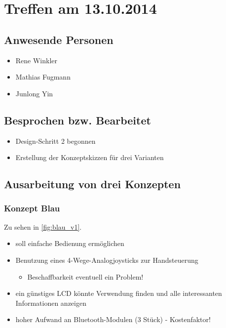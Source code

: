 \chapter{Treffen am 13.10.2014}
\section{Anwesende Personen}
\begin{itemize}
	\item Rene Winkler
	\item Mathias Fugmann
	\item Junlong Yin
\end{itemize}

\section{Besprochen bzw. Bearbeitet}
\begin{itemize}
	\item Design-Schritt 2 begonnen
	\item Erstellung der Konzeptskizzen für drei Varianten
\end{itemize}

\section{Ausarbeitung von drei Konzepten}
\subsection{Konzept Blau}
Zu sehen in \autoref{fig:blau_v1}.
\begin{itemize}
	\item soll einfache Bedienung ermöglichen
	\item Benutzung eines 4-Wege-Analogjoysticks zur Handsteuerung
	\begin{itemize}
		\item Beschaffbarkeit eventuell ein Problem!
	\end{itemize}
	\item ein günstiges LCD könnte Verwendung finden und alle interessanten 	Informationen anzeigen
	\item hoher Aufwand an Bluetooth-Modulen (3 Stück) - Kostenfaktor!
\end{itemize}

